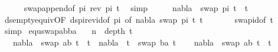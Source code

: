 \begin{isabellebody}
\ \ \ \ \isamarkupfalse%
\ swap{\isacharunderscore}{\kern0pt}append{\isacharbrackleft}{\kern0pt}of\ pi\ {\isacartoucheopen}rev\ pi{\isacartoucheclose}\ t{}{\isacharbrackright}{\kern0pt}\ \isamarkupfalse%
\ simp\isanewline
\ \ \isamarkupfalse%
\ \isamarkupfalse%
\ {\isachardoublequoteopen}nabla\ {\isasymturnstile}\ swap\ pi\ t{}\ {\isasymapprox}\ t{}{\isachardoublequoteclose}\isanewline
\ \ \ \ \isamarkupfalse%
\ ds{\isacharunderscore}{\kern0pt}empty{\isacharunderscore}{\kern0pt}equiv{\isacharunderscore}{\kern0pt}{}{\isacharbrackleft}{\kern0pt}OF\ ds{\isacharunderscore}{\kern0pt}pi{\isacharunderscore}{\kern0pt}rev{\isacharunderscore}{\kern0pt}id{\isacharbrackleft}{\kern0pt}of\ pi{\isacharbrackright}{\kern0pt}{\isacharcomma}{\kern0pt}\ of\ nabla\ {\isacartoucheopen}swap\ pi\ t{}{\isacartoucheclose}\ t{}{\isacharbrackright}{\kern0pt}\ \isanewline
\ \ \ \ \ \ swap{\isacharunderscore}{\kern0pt}id{\isacharbrackleft}{\kern0pt}of\ t{}{\isacharbrackright}{\kern0pt}\ \isamarkupfalse%
\ simp\isakeywordONE{{\isacharbraceright}{\kern0pt}}\isamarkupfalse%
\isanewline
{}\isamarkupfalse%
%
\endisatagproof
{\isafoldproof}%
%
\isadelimproof
\isanewline
%
\endisadelimproof
\isanewline
{}\isamarkupfalse%
\ equ{\isacharunderscore}{\kern0pt}swap{\isacharunderscore}{\kern0pt}abba{\isacharcolon}{\kern0pt}\isanewline
\ \ \ {\isachardoublequoteopen}n\ {\isacharequal}{\kern0pt}\ depth\ t{}{\isachardoublequoteclose}\isanewline
\ \ \ {\isachardoublequoteopen}nabla\ {\isasymturnstile}\ swap\ {\isacharbrackleft}{\kern0pt}{\isacharparenleft}{\kern0pt}a{\isacharcomma}{\kern0pt}b{\isacharparenright}{\kern0pt}{\isacharbrackright}{\kern0pt}\ t{}\ {\isasymapprox}\ t{}\ {\isasymLongrightarrow}\ nabla\ {\isasymturnstile}\ t{}\ {\isasymapprox}\ swap\ {\isacharbrackleft}{\kern0pt}{\isacharparenleft}{\kern0pt}b{\isacharcomma}{\kern0pt}a{\isacharparenright}{\kern0pt}{\isacharbrackright}{\kern0pt}\ t{}{\isachardoublequoteclose}\isanewline
%
\isadelimproof
%
\endisadelimproof
%
\isatagproof
{}\isamarkupfalse%
{\isacharminus}{\kern0pt}\isanewline
\ \ \isamarkupfalse%
\ {\isachardoublequoteopen}nabla\ {\isasymturnstile}\ swap\ {\isacharbrackleft}{\kern0pt}{\isacharparenleft}{\kern0pt}a{\isacharcomma}{\kern0pt}b{\isacharparenright}{\kern0pt}{\isacharbrackright}{\kern0pt}\ t{}\ {\isasymapprox}\ t{}{\isachardoublequoteclose}\isanewline

\end{isabellebody}
